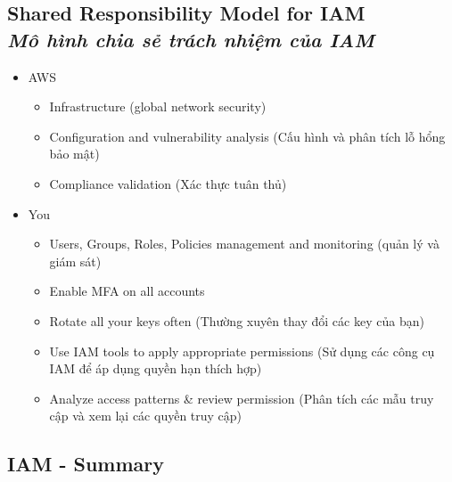 \subsection[Shared Responsibility Model for IAM]{Shared Responsibility Model for IAM \\ \textit{Mô hình chia sẻ trách nhiệm của IAM}}

\begin{itemize}
	\item AWS
	\begin{itemize}
		\item Infrastructure (global network security)
		\item Configuration and vulnerability analysis (Cấu hình và phân tích lỗ hổng bảo mật)
		\item Compliance validation  (Xác thực tuân thủ)
	\end{itemize}
	\item You
	\begin{itemize}
		\item Users, Groups, Roles, Policies
		management and monitoring (quản lý và giám sát)
		\item Enable MFA on all accounts
		\item Rotate all your keys often (Thường xuyên thay đổi các key của bạn)
		\item Use IAM tools to apply
		appropriate permissions (Sử dụng các công cụ IAM để áp dụng quyền hạn thích hợp)
		\item Analyze access patterns \& review permission (Phân tích các mẫu truy cập và xem lại các quyền truy cập)
	\end{itemize}
\end{itemize}


\subsection[IAM - Summary]{IAM - Summary}

